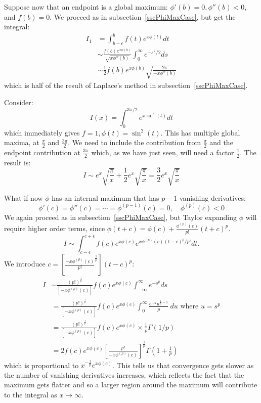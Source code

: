 \documentclass[../Main.tex]{subfiles}
\begin{document}
Suppose now that an endpoint is a global maximum: $\phi'(b) = 0, \phi''(b) < 0$, and $f(b) = 0$. We proceed as in subsection~\ref{sscPhiMaxCase}, but get the integral:
\begin{align*}
    I_1 &= \int_{b-\epsilon}^{b} f(t)e^{x\phi(t)} dt \\
    &\sim \frac{f(b)e^{x\phi(b)}}{\sqrt{x\phi''(b)}} \int_{0}^{\infty} e^{-s^2 / 2} ds \\
    &\sim \frac12 f(b)e^{x\phi(b)} \sqrt{\frac{2\pi}{-x\phi''(b)}}
\end{align*}
which is half of the result of Laplace's method in subsection~\ref{sscPhiMaxCase}.
\begin{example}
    Consider:
    \begin{equation*}
        I(x) = \int_{0}^{3\pi / 2} e^{x\sin^2(t)} dt 
    \end{equation*}
    which immediately gives $f = 1, \phi(t) = \sin^2(t)$. This has multiple global maxima, at $\frac\pi2$ and $\frac{3\pi}2$. We need to include the contribution from $\frac\pi2$ and the endpoint contribution at $\frac{3\pi}{2}$ which, as we have just seen, will need a factor $\frac12$. The result is:
    \begin{equation*}
        I \sim e^x \sqrt{\frac{\pi}{x}} + \frac12 e^x \sqrt{\frac{\pi}{x}} = \frac32 e^x \sqrt{\frac{\pi}{x}}
    \end{equation*}
\end{example}

What if now $\phi$ has an internal maximum that has $p-1$ vanishing derivatives:
\begin{equation*}
    \phi'(c) = \phi''(c) = \cdots = \phi^{(p-1)}(c) = 0,\quad\phi^{(p)}(c) < 0
\end{equation*}
We again proceed as in subsection~\ref{sscPhiMaxCase}, but Taylor expanding $\phi$ will require higher order terms, since $\phi(t + c) = \phi(c) + \frac{\phi^{(p)}(c)}{p!} (t + c)^p$.
\begin{equation*}
    I \sim \int_{c-\epsilon}^{c+\epsilon} f(c)e^{x\phi(c)} e^{x\phi^{(p)}(c)(t-c)^p / p!} dt.
\end{equation*}
We introduce $c = \left[\frac{-x\phi^{(p)}(c)}{p!}^{\frac1p}\right](t-c)^p$:
\begin{align*}
    I &\sim \frac{(p!)^\frac1p}{\left[-x\phi^{(p)}(c)\right]} f(c) e^{x\phi(c)} \int_{-\infty}^{\infty} e^{-s^p} ds \\
    &= \frac{(p!)^\frac1p}{\left[-x\phi^{(p)}(c)\right]} f(c) e^{x\phi(c)} \int_{0}^{\infty} \frac{e^{-u} u^{\frac1p - 1}}{p}~du \text{ where } u = s^p \\
    &= \frac{(p!)^\frac1p}{\left[-x\phi^{(p)}(c)\right]} f(c) e^{x\phi(c)} \times \frac1p \Gamma(1/p) \\
    &= 2f(c)e^{x\phi(c)} \left[\frac{p!}{-x\phi^{(p)}(c)}\right]^\frac1p \Gamma\left(1 + \frac1p\right)
\end{align*}
which is proportional to $x^{-\frac1p} e^{x\phi(c)}$. This tells us that convergence gets slower as the number of vanishing derivatives increases, which reflects the fact that the maximum gets flatter and so a larger region around the maximum will contribute to the integral as $x \to \infty$.
\end{document}
